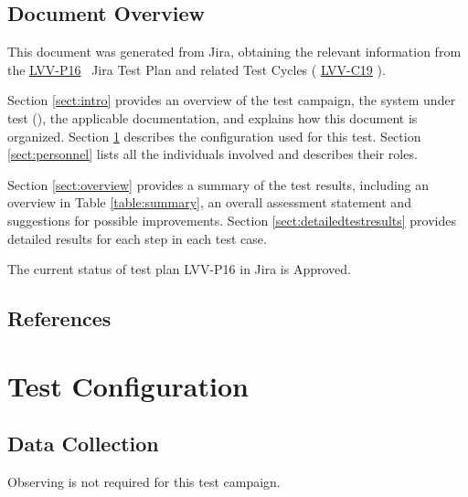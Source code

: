 \documentclass[DM,lsstdraft,STR,toc]{lsstdoc}
\begin{document}
\subsection{Document Overview}
\label{sect:docoverview}

This document was generated from Jira, obtaining the relevant information from the 
\href{https://jira.lsstcorp.org/secure/Tests.jspa#/testPlan/LVV-P16}{LVV-P16}
~Jira Test Plan and related Test Cycles (
  \href{https://jira.lsstcorp.org/secure/Tests.jspa#/testCycle/LVV-C19}{LVV-C19}
).


Section \ref{sect:intro} provides an overview of the test campaign, the system under test (\product{}), the applicable documentation, and explains how this document is organized.
Section \ref{sect:configuration}  describes the configuration used for this test.
Section \ref{sect:personnel} lists all the individuals involved and describes their roles.

Section \ref{sect:overview} provides a summary of the test results, including an overview in Table \ref{table:summary}, an overall assessment statement and suggestions for possible improvements.
Section \ref{sect:detailedtestresults} provides detailed results for each step in each test case.

The current status of test plan LVV-P16 in Jira is Approved.

\subsection{References}
\label{sect:references}
\renewcommand{\refname}{}

\section{Test Configuration}
\label{sect:configuration}

\subsection{Data Collection}

  Observing is not required for this test campaign.
\end{document}
